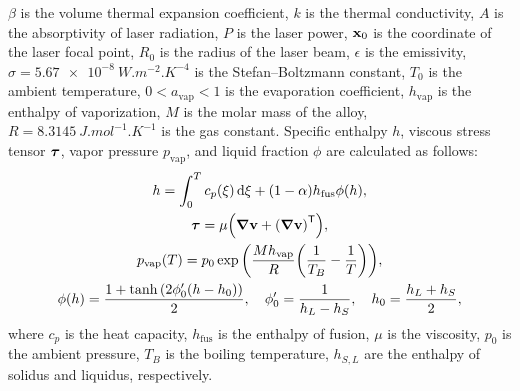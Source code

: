 \documentclass{article}
\newcommand{\tran}{\mathsf{T}} %
\newcommand{\fusion}[1]{{#1}_\mathrm{fus}}
\newcommand{\evapor}[1]{{#1}_\mathrm{vap}}
\newcommand{\bv}{\vb{v}}
\newcommand{\bx}{\vb{x}}
\newcommand{\btau}{\vb*\tau}
\begin{document}
$\beta$ is the volume thermal expansion coefficient,
$k$ is the thermal conductivity, $A$ is the absorptivity of laser radiation, $P$ is the laser power,
$\bx_0$ is the coordinate of the laser focal point, $R_0$ is the radius of the laser beam,
$\epsilon$ is the emissivity,
$\sigma=\SI{5.67e-8}{W.m^{-2}.K^{-4}}$ is the Stefan--Boltzmann constant,
$T_0$ is the ambient temperature,
$0 < \evapor{a} < 1$ is the evaporation coefficient,
$\evapor{h}$ is the enthalpy of vaporization,
$M$ is the molar mass of the alloy,
$R = \SI{8.3145}{J.mol^{-1}.K^{-1}}$ is the gas constant.
Specific enthalpy $h$, viscous stress tensor $\btau$,
vapor pressure $\evapor{p}$,
and liquid fraction $\phi$ are calculated as follows:
\begin{gather}
    h = \int_0^T c_p(\xi)\dd{\xi} + (1-\alpha)\fusion{h}\phi(h), \label{eq:T}\\
    \btau = \mu\qty(\grad\bv + \qty(\grad\bv)^\tran), \label{eq:tau}\\
    \evapor{p}(T) = p_0\exp\qty(\frac{M\evapor{h}}{R}\qty(\frac1{T_B}-\frac1{T})), \label{eq:p_evapor}\\
    \phi(h) = \frac{1 + \tanh\qty(2\phi'_0(h-h_0))}2, \quad
        \phi'_0 = \frac1{h_L-h_S}, \quad h_0 = \frac{h_L+h_S}2, \label{eq:phi}
\end{gather}
where $c_p$ is the heat capacity,
$\fusion{h}$ is the enthalpy of fusion, $\mu$ is the viscosity, 
$p_0$ is the ambient pressure, $T_B$ is the boiling temperature,
$h_{S,L}$ are the enthalpy of solidus and liquidus, respectively.
\end{document}
